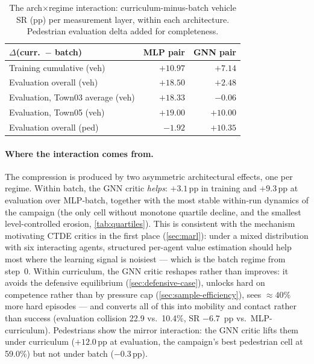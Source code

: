 \begin{table}[t]
  \centering\small
  \caption{The arch$\times$regime interaction: curriculum-minus-batch
  vehicle SR (pp) per measurement layer, within each architecture.
  Pedestrian evaluation delta added for completeness.}
  \label{tab:interaction}
  \begin{tabular}{@{}lrr@{}}
    \toprule
    $\Delta$(curr.\ $-$ batch) & MLP pair & GNN pair \\
    \midrule
    Training cumulative (veh) & $+10.97$ & $+7.14$ \\
    Evaluation overall (veh) & $+18.50$ & $+2.48$ \\
    Evaluation, Town03 average (veh) & $+18.33$ & $-0.06$ \\
    Evaluation, Town05 (veh) & $+19.00$ & $+10.00$ \\
    Evaluation overall (ped) & $-1.92$ & $+10.35$ \\
    \bottomrule
  \end{tabular}
\end{table}

\paragraph{Where the interaction comes from.}
The compression is produced by two asymmetric architectural effects, one
per regime. Within batch, the GNN critic \emph{helps}: $+3.1$\,pp in
training and $+9.3$\,pp at evaluation over MLP-batch, together with the
most stable within-run dynamics of the campaign (the only cell without
monotone quartile decline, and the smallest level-controlled erosion,
\cref{tab:quartiles}). This is consistent with the mechanism motivating
CTDE critics in the first place (\cref{sec:marl}): under a mixed
distribution with six interacting agents, structured per-agent value
estimation should help most where the learning signal is noisiest ---
which is the batch regime from step~0. Within curriculum, the GNN critic
reshapes rather than improves: it avoids the defensive equilibrium
(\cref{sec:defensive-case}), unlocks hard on competence rather than by
pressure cap (\cref{sec:sample-efficiency}), sees $\approx 40$\% more
hard episodes --- and converts all of this into mobility and contact
rather than success (evaluation collision 22.9 vs.\ 10.4\%, SR $-6.7$
\,pp vs.\ MLP-curriculum). Pedestrians show the mirror interaction:
the GNN critic lifts them under curriculum ($+12.0$\,pp at evaluation,
the campaign's best pedestrian cell at 59.0\%) but not under batch
($-0.3$\,pp).

